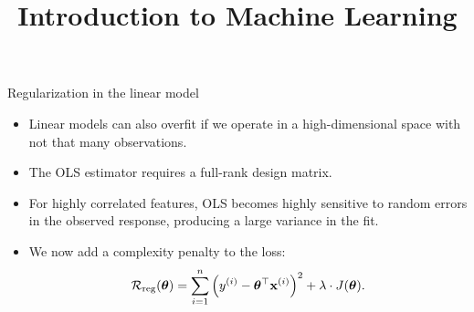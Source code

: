 \documentclass[11pt,compress,t,notes=noshow, xcolor=table]{beamer}
\title{Introduction to Machine Learning}
\date{}
\begin{document}


\begin{vbframe}{Regularization in the linear model}

  \begin{itemize} \setlength{\itemsep}{1.3em}
  \item Linear models can also overfit if we operate in a high-dimensional space with not that many observations.    
  \item The OLS estimator requires a full-rank design matrix.
  \item For highly correlated features, OLS becomes highly sensitive to random errors in the observed response, producing a large variance in the fit. 
  \item We now add a complexity penalty to the loss:
  $$
  \mathcal{R}_{\text{reg}}(\bm{\theta}) = \sum\limits_{i=1}^n \left(y^{(i)} - \bm{\theta}^\top \mathbf{x}^{(i)} \right)^2 + \lambda \cdot J(\bm{\theta}). 
  $$ 
  \end{itemize}

\end{vbframe}






\end{document}
